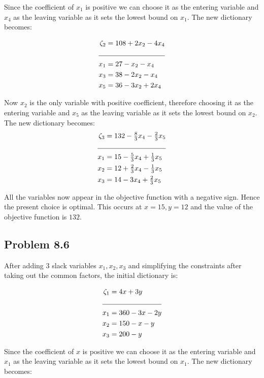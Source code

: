 \documentclass[letterpaper,12pt]{article}
\theoremstyle{definition}
\begin{document}
\begin{enumerate}
Since the coefficient of $x_1$ is positive we can choose  it as the entering variable and $x_4$ as the leaving variable as it sets the lowest bound on $x_1$.  The new dictionary becomes:

\begin{align*}
  \zeta_2 &= 108 + 2x_2 -4x_4\\
  \cline{1-2}
  x_1 &= 27 - x_2 - x_4\\
  x_3 &= 38- 2x_2-x_4\\
  x_5 &= 36 - 3x_2 + 2x_4\\
\end{align*}

Now $x_2$ is the only variable with positive coefficient, therefore choosing it as the entering variable and $x_5$ as the leaving variable as it sets the lowest bound on $x_2$. The new dictionary becomes:
\begin{align*}
  \zeta_3 &= 132 -\tfrac{8}{3}x_4-\tfrac{2}{3}x_5\\
  \cline{1-2}
  x_1 &= 15-\tfrac{5}{3}x_4+\tfrac{1}{3}x_5\\
  x_2 &= 12+\tfrac{2}{3}x_4-\tfrac{1}{3}x_5\\
  x_3 &= 14-3x_4+\tfrac{2}{3}x_5 \\
\end{align*}

All the variables now appear in the objective function with a negative sign. Hence the present choice is optimal.
This occurs at $x=15, y=12$ and the value of the objective function is $132$.
\end{enumerate}

\subsection*{Problem 8.6 }
After adding 3 slack variables $x_1, x_2, x_3$ and simplifying the constraints after taking out the common factors, the initial dictionary is:

\begin{align*}
  \zeta_1 &= 4x+3y\\
  \cline{1-2}
  x_1 &= 360-3x-2y\\
  x_2&= 150-x-y\\
  x_3 &= 200-y \\
\end{align*}


\begin{flushleft}
Since the coefficient of $x$ is positive we can choose  it as the entering variable and $x_1$ as the leaving variable as it sets the lowest bound on $x_1$.  The new dictionary becomes:
\end{flushleft}
\end{document}
